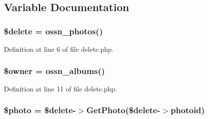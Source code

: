 \subsection{Variable Documentation}
\subsubsection[{\texorpdfstring{\$delete}{$delete}}]{\setlength{\rightskip}{0pt plus 5cm}\$delete = {\bf ossn\+\_\+photos}()}\hypertarget{components_2_ossn_photos_2actions_2photo_2delete_8php_aba2374a8b713514611e21494ec2fef8d}{}\label{components_2_ossn_photos_2actions_2photo_2delete_8php_aba2374a8b713514611e21494ec2fef8d}


Definition at line 6 of file delete.\+php.

\subsubsection[{\texorpdfstring{\$owner}{$owner}}]{\setlength{\rightskip}{0pt plus 5cm}\$owner = {\bf ossn\+\_\+albums}()}\hypertarget{components_2_ossn_photos_2actions_2photo_2delete_8php_a9aabf46bdb166877480b2094d7ca01a7}{}\label{components_2_ossn_photos_2actions_2photo_2delete_8php_a9aabf46bdb166877480b2094d7ca01a7}


Definition at line 11 of file delete.\+php.

\subsubsection[{\texorpdfstring{\$photo}{$photo}}]{\setlength{\rightskip}{0pt plus 5cm}\$photo = \$delete-\/$>$Get\+Photo(\$delete-\/$>${\bf photoid})}\hypertarget{components_2_ossn_photos_2actions_2photo_2delete_8php_ae68c67c422f1090027f6eb6ba01b62b2}{}\label{components_2_ossn_photos_2actions_2photo_2delete_8php_ae68c67c422f1090027f6eb6ba01b62b2}


